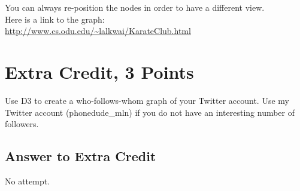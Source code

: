 \documentclass[letterpaper,11pt]{article}
\begin{document}
You can always re-position the nodes in order to have a different view.\\

Here is a link to the graph:\\
\url{http://www.cs.odu.edu/~lalkwai/KarateClub.html}

\begin{minipage}{\linewidth}
\hspace*{-1.6in}
\label{visina8}
\end{minipage}

\begin{minipage}{\linewidth}
\hspace*{-1.6in}
\label{visina8}
\end{minipage}

\newpage

\section*{Extra Credit, 3 Points}

Use D3 to create a who-follows-whom graph of your Twitter account. Use my Twitter account (phonedude\_mln) if you do not have an interesting number of followers.
\newpage

\subsection*{Answer to Extra Credit}
No attempt.
\newpage
\end{document}
